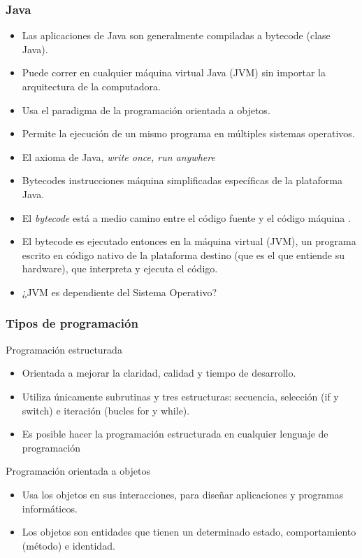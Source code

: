 \documentclass{beamer}
\begin{document}
\begin{frame}
\frametitle{Java}
\begin{small}
\begin{itemize}[<+->]
\item Las aplicaciones de Java son generalmente compiladas a bytecode (clase Java).
\item Puede correr en cualquier máquina virtual Java (JVM) sin importar la arquitectura de la computadora.
\item Usa el paradigma de la programación orientada a objetos.
\item Permite la ejecución de un mismo programa en múltiples sistemas operativos.
\item El axioma de Java, \emph{write once, run anywhere}
\item \alert{Bytecodes} instrucciones máquina simplificadas específicas de la plataforma Java.
\item El \emph{bytecode} está a medio camino entre el código fuente y el código máquina .
\item El bytecode es ejecutado entonces en la máquina virtual (JVM), un programa escrito en código nativo de la plataforma destino (que es el que entiende su hardware), que interpreta y ejecuta el código.
\item ¿JVM es dependiente del Sistema Operativo?
\end{itemize}
\end{small}
\end{frame}

\begin{frame}
\frametitle{Tipos de programación}
\begin{block}{Programación estructurada}
\begin{itemize}[<+->]
\item Orientada a mejorar la claridad, calidad y tiempo de desarrollo.
\item Utiliza únicamente subrutinas y tres estructuras: secuencia, selección (if y switch) e iteración (bucles for y while).
\item Es posible hacer la programación estructurada en cualquier lenguaje de programación
\end{itemize}
\end{block}
\pause
\begin{block}{Programación orientada a objetos}
\begin{itemize}[<+->]
\item Usa los objetos en sus interacciones, para diseñar aplicaciones y programas informáticos.
\item Los objetos son entidades que tienen un determinado estado, comportamiento (método) e identidad.
\end{itemize}
\end{block}
\end{frame}
\end{document}
